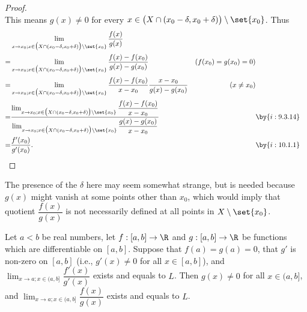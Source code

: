 \begin{proof}
\[  \]
  This means \(g(x) \neq 0\) for every \(x \in \big(X \cap (x_0 - \delta, x_0 + \delta)\big) \setminus \set{x_0}\).
  Thus
  \begin{align*}
      & \lim_{x \to x_0 ; x \in \big(X \cap (x_0 - \delta, x_0 + \delta)\big) \setminus \set{x_0}} \dfrac{f(x)}{g(x)}                                                                                                                                                                                        \\
    = & \lim_{x \to x_0 ; x \in \big(X \cap (x_0 - \delta, x_0 + \delta)\big) \setminus \set{x_0}} \dfrac{f(x) - f(x_0)}{g(x) - g(x_0)}                                                                                                                              & (f(x_0) = g(x_0) = 0)                 \\
    = & \lim_{x \to x_0 ; x \in \big(X \cap (x_0 - \delta, x_0 + \delta)\big) \setminus \set{x_0}} \dfrac{f(x) - f(x_0)}{x - x_0} \dfrac{x - x_0}{g(x) - g(x_0)}                                                                                                     & (x \neq x_0)                          \\
    = & \dfrac{\lim_{x \to x_0 ; x \in \big(X \cap (x_0 - \delta, x_0 + \delta)\big) \setminus \set{x_0}} \dfrac{f(x) - f(x_0)}{x - x_0}}{\lim_{x \to x_0 ; x \in \big(X \cap (x_0 - \delta, x_0 + \delta)\big) \setminus \set{x_0}} \dfrac{g(x) - g(x_0)}{x - x_0}} &                       & \by{i:9.3.14} \\
    = & \dfrac{f'(x_0)}{g'(x_0)}.                                                                                                                                                                                                                                    &                       & \by{i:10.1.1}
  \end{align*}
\end{proof}

\begin{note}
  The presence of the \(\delta\) here may seem somewhat strange, but is needed because \(g(x)\) might vanish at some points other than \(x_0\), which would imply that quotient \(\dfrac{f(x)}{g(x)}\) is not necessarily defined at all points in \(X \setminus \set{x_0}\).
\end{note}

\begin{prop}\label{i:10.5.2}
  Let \(a < b\) be real numbers, let \(f : [a, b] \to \R\) and \(g : [a, b] \to \R\) be functions which are differentiable on \([a, b]\).
  Suppose that \(f(a) = g(a) = 0\), that \(g'\) is non-zero on \([a, b]\) (i.e., \(g'(x) \neq 0\) for all \(x \in [a, b]\)), and \(\lim_{x \to a ; x \in (a, b]} \dfrac{f'(x)}{g'(x)}\) exists and equals to \(L\).
  Then \(g(x) \neq 0\) for all \(x \in (a, b]\), and \(\lim_{x \to a ; x \in (a, b]} \dfrac{f(x)}{g(x)}\) exists and equals to \(L\).
\end{prop}

